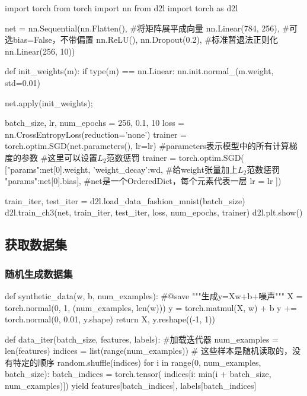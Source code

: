       \begin{codeblock}[language=python, caption={Multilayer}]
        import torch
        from torch import nn
        from d2l import torch as d2l

        net = nn.Sequential(nn.Flatten(), #将矩阵展平成向量
                            nn.Linear(784, 256), #可选bias=False，不带偏置
                            nn.ReLU(),
                            nn.Dropout(0.2), #标准暂退法正则化
                            nn.Linear(256, 10))

        def init_weights(m):
            if type(m) == nn.Linear:
                nn.init.normal_(m.weight, std=0.01)

        net.apply(init_weights);

        batch_size, lr, num_epochs = 256, 0.1, 10
        loss = nn.CrossEntropyLoss(reduction='none')
        trainer = torch.optim.SGD(net.parameters(), lr=lr)
        #parameters表示模型中的所有计算梯度的参数
        #这里可以设置$L_2$范数惩罚
        trainer = torch.optim.SGD(
            [{"params":net[0].weight, 'weight_decay':wd}, #给weight张量加上$L_2$范数惩罚
             {"params":net[0].bias}], #net是一个OrderedDict，每个元素代表一层
            lr = lr
        ])

        train_iter, test_iter = d2l.load_data_fashion_mnist(batch_size)
        d2l.train_ch3(net, train_iter, test_iter, loss, num_epochs, trainer)
        d2l.plt.show()
      \end{codeblock}

  \subsection{获取数据集}
    \subsubsection{随机生成数据集}
      \begin{codeblock}[language=python, caption={Get linear data}]
        def synthetic_data(w, b, num_examples):  #@save
            """生成y=Xw+b+噪声"""
            X = torch.normal(0, 1, (num_examples, len(w)))
            y = torch.matmul(X, w) + b
            y += torch.normal(0, 0.01, y.shape)
            return X, y.reshape((-1, 1))

        def data_iter(batch_size, features, labels): #加载迭代器
            num_examples = len(features)
            indices = list(range(num_examples))
            # 这些样本是随机读取的，没有特定的顺序
            random.shuffle(indices)
            for i in range(0, num_examples, batch_size):
                batch_indices = torch.tensor(
                    indices[i: min(i + batch_size, num_examples)])
                yield features[batch_indices], labels[batch_indices]
      \end{codeblock}

